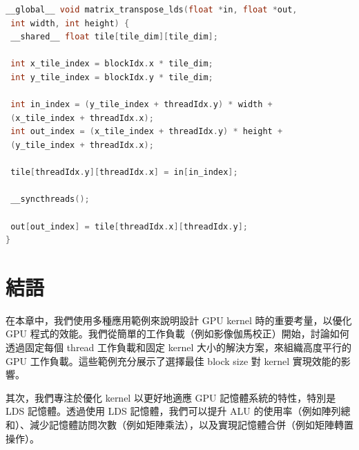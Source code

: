 \begin{lstlisting}[language=C, caption={使用 LDS 的矩陣轉置 kernel 範例。}, captionpos=t, label={lst:transpose}]
__global__ void matrix_transpose_lds(float *in, float *out,
 int width, int height) {
 __shared__ float tile[tile_dim][tile_dim];

 int x_tile_index = blockIdx.x * tile_dim;
 int y_tile_index = blockIdx.y * tile_dim;

 int in_index = (y_tile_index + threadIdx.y) * width +
 (x_tile_index + threadIdx.x);
 int out_index = (x_tile_index + threadIdx.y) * height +
 (y_tile_index + threadIdx.x);

 tile[threadIdx.y][threadIdx.x] = in[in_index];

 __syncthreads();

 out[out_index] = tile[threadIdx.x][threadIdx.y];
}
\end{lstlisting}

\section{結語}
在本章中，我們使用多種應用範例來說明設計 GPU kernel 時的重要考量，以優化 GPU 程式的效能。我們從簡單的工作負載（例如影像伽馬校正）開始，討論如何透過固定每個 thread 工作負載和固定 kernel 大小的解決方案，來組織高度平行的 GPU 工作負載。這些範例充分展示了選擇最佳 block size 對 kernel 實現效能的影響。

其次，我們專注於優化 kernel 以更好地適應 GPU 記憶體系統的特性，特別是 LDS 記憶體。透過使用 LDS 記憶體，我們可以提升 ALU 的使用率（例如陣列總和）、減少記憶體訪問次數（例如矩陣乘法），以及實現記憶體合併（例如矩陣轉置操作）。